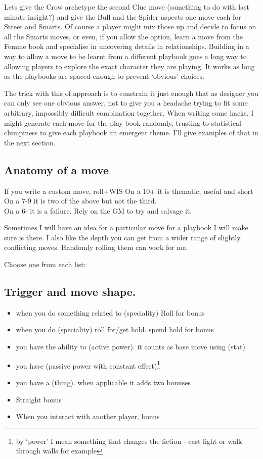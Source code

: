 \documentclass{tufte-handout}
\begin{document}
Lets give the Crow archetype the second Clue move (something to do with last minute insight?) and give the Bull and the Spider aspects one move each for Street and Smarts. Of course a player might mix those up and decide to focus on all the Smarts moves, or even, if you allow the option, learn a move from the Femme book and specialise in uncovering details in relationships. Building in a way to allow a move to be learnt from a different playbook goes a long way to allowing players to explore the exact character they are playing. It works as long as the playbooks are spaced enough to prevent `obvious' choices.
 
The trick with this of approach is to constrain it just enough that as designer you can only see one obvious answer, not to give you a headache trying to fit some arbitrary, impossibly difficult combination together. 
When writing some hacks, I might generate each move for the play book randomly, trusting to statistical clumpiness to give each playbook an emergent theme. I'll give examples of that in the next section.
 
 \subsection{Anatomy of a move}
If you write a custom move, roll+WIS
On a 10+ it is thematic, useful and short \\
On a 7-9  it is two of the above but not the third.\\
On a 6- it is a failure. Rely on the GM to try and salvage it.

Sometimes I will have an idea for a particular move for a playbook I will make sure is there. I also like the depth you can get from a wider range of slightly conflicting moves. Randomly rolling them can work for me.

Choose one from each list:

\subsection{Trigger and move shape.}
\begin{itemize}
\item when you do something related to (speciality) Roll for bonus
\item when you do (speciality) roll for/get hold. spend hold for bonus
\item you have the ability to (active power). it counts as base move using (stat)
\item you have (passive power with constant effect)\footnote{by `power' I mean something that changes the fiction - cast light or walk through walls for example}
\item you have a (thing). when applicable it adds two bonuses
\item Straight bonus
\item When you interact with another player, bonus
\end{itemize}
\end{document}
